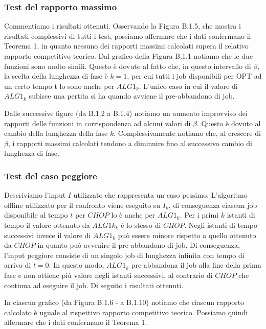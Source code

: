 \documentclass[12pt]{article}
\begin{document}
\subsubsection{Test del rapporto massimo}
Commentiamo i risultati ottenuti. Osservando la Figura B.1.5, che mostra i risultati complessivi di tutti i test, possiamo affermare che i dati confermano il Teorema 1, in quanto nessuno dei rapporti massimi calcolati supera il relativo rapporto competitivo teorico.
Dal grafico della Figura B.1.1 notiamo che le due funzioni sono molto simili. Questo è dovuto al fatto che, in questo intervallo di $\beta$, la scelta della lunghezza di fase è $k=1$, per cui tutti i job disponibili per OPT ad un certo tempo t lo sono anche per $ALG1_{k}$. L'unico caso in cui il valore di $ALG1_{k}$ subisce una pertita si ha quando avviene il pre-abbandono di job.

Dalle successive figure (da B.1.2 a B.1.4) notiamo un aumento improvviso dei rapporti delle funzioni in corrispondenza ad alcuni valori di $\beta$. Questo è dovuto al cambio della lunghezza della fase $k$. Complessivamente notiamo che, al crescere di $\beta$, i rapporti massimi calcolati tendono a diminuire fino al successivo cambio di lunghezza di fase.

\subsubsection{Test del caso peggiore}
Descriviamo l'input $I$ utilizzato che rappresenta un caso pessimo. L'algoritmo offline utilizzato per il confronto viene eseguito su $I_{k}$, di conseguenza ciascun job disponibile al tempo $t$ per $CHOP$ lo è anche per $ALG1_{k}$. Per i primi $k$ istanti di tempo il valore ottenuto da $ALG1k_{k}$ è lo stesso di $CHOP$. Negli istanti di tempo successivi invece il valore di $ALG1_{k}$ può essere minore rispetto a quello ottenuto da $CHOP$ in quanto può avvenire il pre-abbandono di job. Di conseguenza, l'input peggiore consiste di un singolo job di lunghezza infinita con tempo di arrivo di $t = 0$. In questo modo, $ALG1_{k}$ pre-abbandona il job alla fine della prima fase e non ottiene più valore negli istanti successivi, al contrario di $CHOP$ che continua ad eseguire il job. Di seguito i risultati ottenuti.

In ciascun grafico (da Figura B.1.6 - a B.1.10) notiamo che ciascun rapporto calcolato è uguale al rispettivo rapporto competitivo teorico. Possiamo quindi affermare che i dati confermano il Teorema 1.
\end{document}
